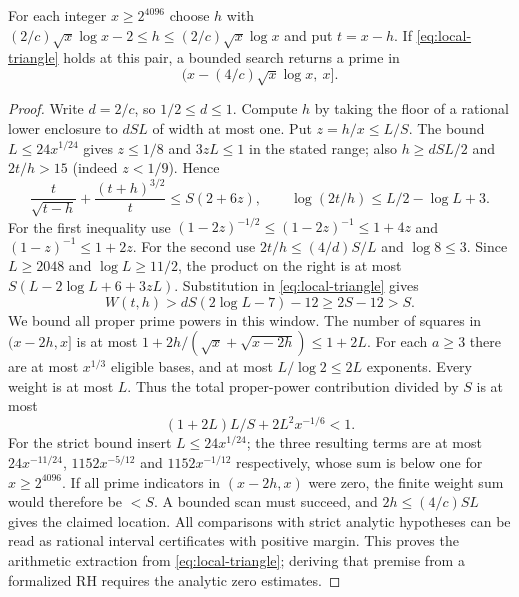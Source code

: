 \begin{proposition}
For each integer $x\ge2^{4096}$ choose $h$ with $(2/c)\sqrt x\log x-2\le h\le(2/c)\sqrt x\log x$ and put $t=x-h$. If \eqref{eq:local-triangle} holds at this pair, a bounded search returns a prime in
\[
 (x-(4/c)\sqrt x\log x,\ x].
\]
\end{proposition}
\begin{proof}
Write $d=2/c$, so $1/2\le d\le1$. Compute $h$ by taking the floor of a rational lower enclosure to $dSL$ of width at most one. Put $z=h/x\le L/S$. The bound $L\le24x^{1/24}$ gives $z\le1/8$ and $3zL\le1$ in the stated range; also $h\ge dSL/2$ and $2t/h>15$ (indeed $z<1/9$). Hence
\[
 \frac{t}{\sqrt{t-h}}+\frac{(t+h)^{3/2}}t\le S(2+6z),
 \qquad \log(2t/h)\le L/2-\log L+3 .
\]
For the first inequality use $(1-2z)^{-1/2}\le(1-2z)^{-1}\le1+4z$ and $(1-z)^{-1}\le1+2z$. For the second use $2t/h\le(4/d)S/L$ and $\log 8\le3$. Since $L\ge2048$ and $\log L\ge11/2$, the product on the right is at most $S(L-2\log L+6+3zL)$. Substitution in \eqref{eq:local-triangle} gives
\[
 W(t,h)>dS(2\log L-7)-12\ge 2S-12>S.
\]
We bound all proper prime powers in this window. The number of squares in $(x-2h,x]$ is at most
$1+2h/(\sqrt x+\sqrt{x-2h})\le1+2L$. For each $a\ge3$ there are at most $x^{1/3}$ eligible bases, and at most $L/\log 2\le2L$ exponents. Every weight is at most $L$. Thus the total proper-power contribution divided by $S$ is at most
\[
 (1+2L)L/S+2L^2 x^{-1/6}<1.
\]
For the strict bound insert $L\le24 x^{1/24}$; the three resulting terms are at most $24x^{-11/24}$, $1152x^{-5/12}$ and $1152x^{-1/12}$ respectively, whose sum is below one for $x\ge2^{4096}$. If all prime indicators in $(x-2h,x)$ were zero, the finite weight sum would therefore be $<S$. A bounded scan must succeed, and $2h\le(4/c)SL$ gives the claimed location. All comparisons with strict analytic hypotheses can be read as rational interval certificates with positive margin. This proves the arithmetic extraction from \eqref{eq:local-triangle}; deriving that premise from a formalized RH requires the analytic zero estimates.
\end{proof}
